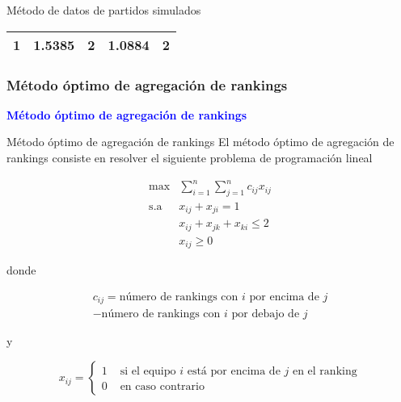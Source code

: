 \documentclass[10pt]{beamer}
\begin{document}
\begin{frame}{Método de datos de partidos simulados}
\begin{ejemplo}[continuación]
\begin{table}[h]
\begin{tabular}{@{}ccccc@{}}
				1 & 1.5385                                                           & 2                                                          & 1.0884                                                           & 2                                                          \\ \bottomrule
			\end{tabular}
		\end{table}
			
		\end{ejemplo}
	\end{frame}
	
	\subsubsection{Método óptimo de agregación de rankings}
	
	\begin{frame}
		\begin{center}
			\Huge\textbf{\textsf{\textcolor{blue}{Método óptimo de agregación de rankings}}}
		\end{center}
	\end{frame}
	
	\begin{frame}{Método óptimo de agregación de rankings}
		El método óptimo de agregación de rankings consiste en resolver el siguiente problema de programación lineal
		
		 \begin{equation}
		 \begin{array}{rl}
		 \max         & \sum\limits_{i=1}^{n} \sum\limits_{j=1}^{n} c_{ij} x_{ij}\\
		 \mathrm{s.a} & x_{ij} + x_{ji} = 1\\
		 & x_{ij} + x_{jk} + x_{ki} \leq 2\\
		 & x_{ij} \geq 0
		 \end{array}
		 \end{equation}
		 
		 donde 
		 
		 \begin{multline} \label{eq:conformidad}
		 c_{ij} = \text{número de rankings con $i$ por encima de $j$} \\ - \text{número de rankings con $i$ por debajo de $j$}
		 \end{multline}
		 
		 y
		 
		 \begin{equation}
		 x_{ij} = \begin{cases}
		 1 & \text{ si el equipo $i$ está por encima de $j$ en el ranking}\\
		 0 & \text{ en caso contrario}
		 \end{cases}
		 \end{equation}
	\end{frame}
	
\end{document}
